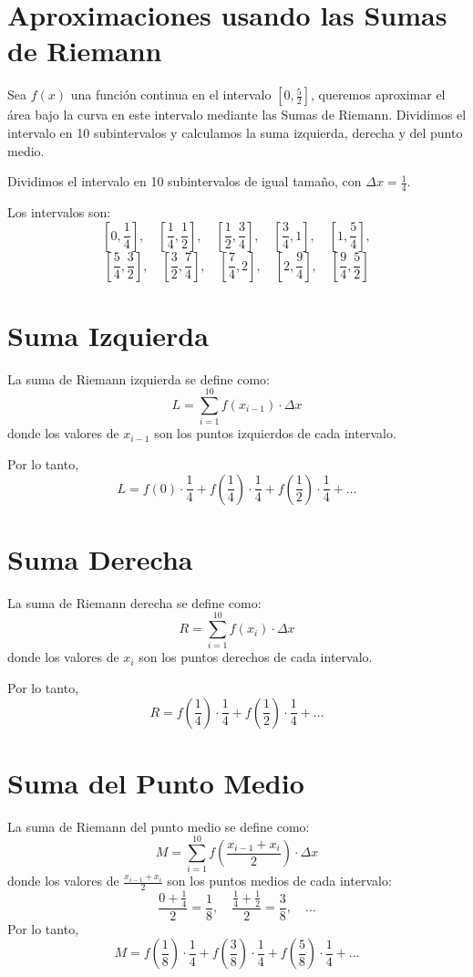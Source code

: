 \documentclass{article}
\begin{document}
\section*{Aproximaciones usando las Sumas de Riemann}

Sea \( f(x) \) una función continua en el intervalo \([0, \frac{5}{2}]\), queremos aproximar el área bajo la curva en este intervalo mediante las Sumas de Riemann. Dividimos el intervalo en 10 subintervalos y calculamos la suma izquierda, derecha y del punto medio.

Dividimos el intervalo en 10 subintervalos de igual tamaño, con \(\Delta x = \frac{1}{4}\).

Los intervalos son:
\[
    \left[0, \frac{1}{4}\right], \quad \left[\frac{1}{4}, \frac{1}{2}\right], \quad \left[\frac{1}{2}, \frac{3}{4}\right], \quad \left[\frac{3}{4}, 1\right],\quad \left[1, \frac{5}{4}\right], 
\]
\[
    \left[\frac{5}{4}, \frac{3}{2}\right],\quad \left[\frac{3}{2}, \frac{7}{4}\right],\quad \left[\frac{7}{4}, 2\right],\quad \left[2, \frac{9}{4}\right], \quad \left[\frac{9}{4}, \frac{5}{2}\right]
\]

\section{Suma Izquierda}
La suma de Riemann izquierda se define como:
\[
L = \sum_{i=1}^{10} f(x_{i-1}) \cdot \Delta x
\]
donde los valores de \( x_{i-1} \) son los puntos izquierdos de cada intervalo.

Por lo tanto,
\[
L = f(0) \cdot \frac{1}{4} + f\left(\frac{1}{4}\right) \cdot \frac{1}{4} + f\left(\frac{1}{2}\right) \cdot \frac{1}{4} + \dots 
\]

\section{Suma Derecha}
La suma de Riemann derecha se define como:
\[
R = \sum_{i=1}^{10} f(x_{i}) \cdot \Delta x
\]
donde los valores de \( x_{i} \) son los puntos derechos de cada intervalo.

Por lo tanto,
\[
R = f\left(\frac{1}{4}\right) \cdot \frac{1}{4} + f\left(\frac{1}{2}\right) \cdot \frac{1}{4} + \dots 
\]
\section{Suma del Punto Medio}
La suma de Riemann del punto medio se define como:
\[
M = \sum_{i=1}^{10} f\left(\frac{x_{i-1} + x_i}{2}\right) \cdot \Delta x
\]
donde los valores de \( \frac{x_{i-1} + x_i}{2} \) son los puntos medios de cada intervalo:
\[
\frac{0 + \frac{1}{4}}{2} = \frac{1}{8}, \quad \frac{\frac{1}{4} + \frac{1}{2}}{2} = \frac{3}{8}, \quad \dots
\]
Por lo tanto,
\[
M = f\left(\frac{1}{8}\right) \cdot \frac{1}{4} + f\left(\frac{3}{8}\right) \cdot \frac{1}{4} + f\left(\frac{5}{8}\right) \cdot \frac{1}{4} + \dots
\]
\end{document}
